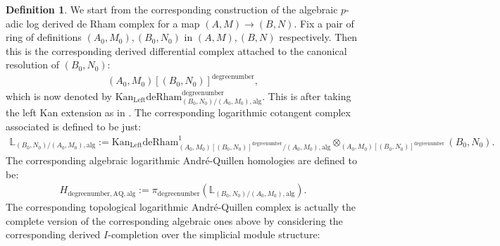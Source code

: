 \documentclass[11pt]{book}
\theoremstyle{definition}
\newtheorem{definition}[theorem]{Definition}
\numberwithin{equation}{section}
\begin{document}
\begin{definition}
We start from the corresponding construction of the algebraic $p$-adic log derived de Rham complex for a map $(A,M)\rightarrow (B,N)$. Fix a pair of ring of definitions $(A_0,M_0),(B_0,N_0)$ in $(A,M),(B,N)$ respectively. Then this is the corresponding derived differential complex attached to the canonical resolution of $(B_0,N_0)$:
\begin{align}
(A_0,M_0)[(B_0,N_0)]^\text{degreenumber},	
\end{align}
which is now denoted by $\mathrm{Kan}_\mathrm{Left}\mathrm{deRham}^\text{degreenumber}_{(B_0,N_0)/(A_0,M_0),\mathrm{alg}}$. This is after taking the left Kan extension as in \cite[Chapter 6]{12B1}. The corresponding logarithmic cotangent complex associated is defined to be just:
\begin{align}
\mathbb{L}_{(B_0,N_0)/(A_0,M_0),\mathrm{alg}}:=	\mathrm{Kan}_\mathrm{Left}\mathrm{deRham}^1_{(A_0,M_0)[(B_0,N_0)]^\text{degreenumber}/(A_0,M_0),\mathrm{alg}}\otimes_{(A_0,M_0)[(B_0,N_0)]^\text{degreenumber}} (B_0,N_0).
\end{align}
The corresponding algebraic logarithmic Andr\'e-Quillen homologies are defined to be:
\begin{align}
H_{\text{degreenumber},{\mathrm{AQ}},\mathrm{alg}}:=\pi_\text{degreenumber} (\mathbb{L}_{(B_0,N_0)/(A_0,M_0),\mathrm{alg}}). 	
\end{align}
The corresponding topological logarithmic Andr\'e-Quillen complex is actually the complete version of the corresponding algebraic ones above by considering the corresponding derived $I$-completion over the simplicial module structure:


\end{definition}
\end{document}
